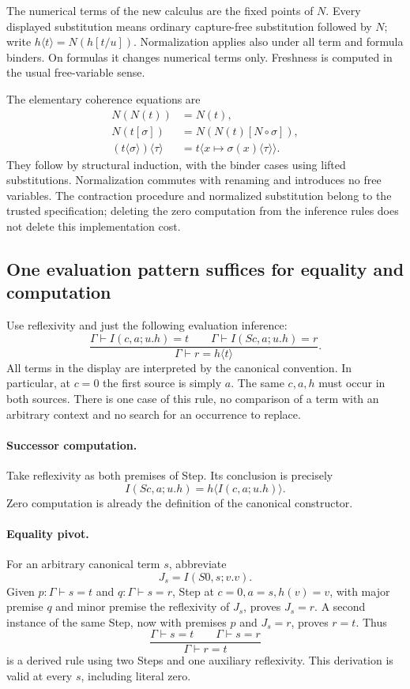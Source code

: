 \documentclass[11pt,letterpaper]{article}
\theoremstyle{definition}
\begin{document}
The numerical terms of the new calculus are the fixed points of $N$.
Every displayed substitution means ordinary capture-free substitution
followed by $N$; write $h\langle t\rangle=N(h[t/u])$. Normalization applies
also under all term and formula binders. On formulas it changes numerical
terms only. Freshness is computed in the usual free-variable sense.

The elementary coherence equations are
\begin{align*}
 N(N(t))&=N(t),\\
 N(t[\sigma])&=N(N(t)[N\circ\sigma]),\\
 (t\langle\sigma\rangle)\langle\tau\rangle
 &=t\langle x\mapsto\sigma(x)\langle\tau\rangle\rangle.
\end{align*}
They follow by structural induction, with the binder cases using lifted
substitutions. Normalization commutes with renaming and introduces no
free variables. The contraction procedure and normalized substitution
belong to the trusted specification; deleting the zero computation from
the inference rules does not delete this implementation cost.

\subsection{One evaluation pattern suffices for equality and computation}

Use reflexivity and just the following evaluation inference:
\[
 \frac{\Gamma\vdash I(c,a;u.h)=t
       \qquad
       \Gamma\vdash I(Sc,a;u.h)=r}
      {\Gamma\vdash r=h\langle t\rangle}.
 \tag{Step}\label{rule:uniform-step}
\]
All terms in the display are interpreted by the canonical convention.
In particular, at $c=0$ the first source is simply $a$. The same
$c,a,h$ must occur in both sources. There is one case of this rule, no
comparison of a term with an arbitrary context and no search for an
occurrence to replace.

\paragraph{Successor computation.}
Take reflexivity as both premises of Step. Its conclusion is precisely
\[
 I(Sc,a;u.h)=h\langle I(c,a;u.h)\rangle.
 \tag{Succ}
\]
Zero computation is already the definition of the canonical constructor.

\paragraph{Equality pivot.}
For an arbitrary canonical term $s$, abbreviate
\[
 J_s=I(S0,s;v.v).
\]
Given $p:\Gamma\vdash s=t$ and $q:\Gamma\vdash s=r$, Step at
$c=0,a=s,h(v)=v$, with major premise $q$ and minor premise the
reflexivity of $J_s$, proves $J_s=r$. A second instance of the same
Step, now with premises $p$ and $J_s=r$, proves $r=t$. Thus
\[
 \frac{\Gamma\vdash s=t\qquad\Gamma\vdash s=r}
      {\Gamma\vdash r=t}
 \tag{Pivot}\label{rule:pivot}
\]
is a derived rule using two Steps and one auxiliary reflexivity.
This derivation is valid at every $s$, including literal zero.
\end{document}
